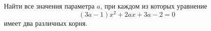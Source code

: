 \begin{ex}
	\begin{condition}
		Найти все значения параметра \( a \), при каждом из которых уравнение \[ (3a-1)x^2+2ax+3a-2=0 \] имеет два различных корня.
	\end{condition}
\end{ex}